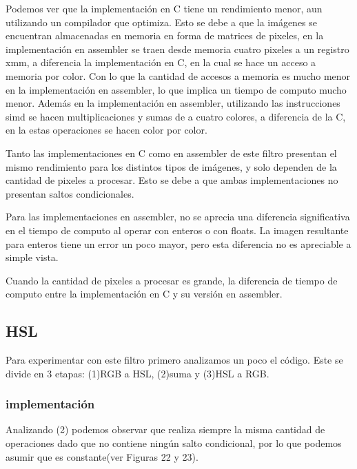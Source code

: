 \documentclass[a4paper]{article}
\begin{document}
Podemos ver que la implementación en C tiene un rendimiento menor, aun utilizando un compilador que optimiza. Esto se debe a que la imágenes se encuentran almacenadas en memoria en forma de matrices de pixeles, en la implementación en assembler se traen desde memoria cuatro pixeles a un registro xmm, a diferencia la implementación en C, en la cual se hace un acceso a memoria por color. Con lo que la cantidad de accesos a memoria es mucho menor en la implementación en assembler, lo que implica un tiempo de computo mucho menor. Además en la implementación en assembler, utilizando las instrucciones simd se hacen multiplicaciones y sumas de a cuatro colores, a diferencia de la C, en la estas operaciones se hacen color por color.

Tanto las implementaciones en C como en assembler de este filtro presentan el mismo rendimiento para los distintos tipos de imágenes, y solo dependen de la cantidad de pixeles a procesar. Esto se debe a que ambas implementaciones no presentan saltos condicionales.

Para las implementaciones en assembler, no se aprecia una diferencia significativa en el tiempo de computo al operar con enteros o con floats. La imagen resultante para enteros tiene un error un poco mayor, pero esta diferencia no es apreciable a simple vista.

Cuando la cantidad de pixeles a procesar es grande, la diferencia de tiempo de computo entre la implementación en C y su versión en assembler.

\subsection{HSL}
Para experimentar con este filtro primero analizamos un poco el código. Este se divide en 3 etapas: (1)RGB a HSL, (2)suma y (3)HSL a RGB.

\subsubsection{implementación}
 Analizando (2) podemos observar que realiza siempre la misma cantidad de operaciones dado que no contiene ningún salto condicional, por lo que podemos asumir que es constante(ver Figuras 22 y 23).
\end{document}
